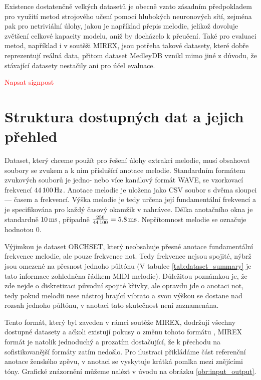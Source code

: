 Existence dostatenčně velkých datasetů je obecně vzato zásadním předpokladem pro využití metod strojového učení pomocí hlubokých neuronových sítí, zejména pak pro netriviální úlohy, jakou je například přepis melodie, jelikož dovoluje zvětšení celkové kapacity modelu, aniž by docházelo k přeučení. Také pro evaluaci metod, například i v soutěži MIREX, jsou potřeba takové datasety, které dobře reprezentují reálná data, přitom dataset MedleyDB vznikl mimo jiné z důvodu, že stávající datasety nestačily ani pro účel evaluace. 

\textcolor{red}{Napsat signpost}




\section{Struktura dostupných dat a jejich přehled}

Dataset, který chceme použít pro řešení úlohy extrakci melodie, musí obsahovat soubory se zvukem a k nim příslušící anotace melodie. Standardním formátem zvukových souborů je jedno- nebo více kanálový formát WAVE, se vzorkovací frekvencí $44\,100\,\rm Hz$. Anotace melodie je uložena jako CSV soubor s dvěma sloupci --- časem a frekvencí. Výška melodie je tedy určena její fundamentální frekvencí a je specifikována pro každý časový okamžik v nahrávce. Délka anotačního okna je standardně $10\,\rm ms$, případně $\frac{256}{44\,100} = 5.8 \,\rm ms$. Nepřítomnost melodie se označuje hodnotou 0.

Výjimkou je dataset ORCHSET, který neobsahuje přesné anotace fundamentální frekvence melodie, ale pouze frekvence not. Tedy frekvence nejsou spojité, nýbrž jsou omezené na přesnost jednoho půltónu (V tabulce \ref{tab:dataset_summary} je tato informace zohledněna řádkem MIDI melodie). Důležitou poznámkou je, že zde nejde o diskretizaci původní spojité křivky, ale opravdu jde o anotaci not, tedy pokud melodii nese nástroj hrající vibrato a svou výškou se dostane nad rozsah jednoho půltónu, v anotaci tato skutečnost není zaznamenána. 

Tento formát, který byl zaveden v rámci soutěže MIREX, dodržují všechny dostupné datasety a ačkoli existují pokusy o změnu tohoto formátu \citep{Humphrey2014a}, MIREX formát je natolik jednoduchý a prozatím dostačující, že k přechodu na sofistikovanější formáty zatím nedošlo. Pro ilustraci přikládáme část referenční anotace ženského zpěvu, v anotaci se vyskytuje krátká pomlka mezi znějícími tóny. Grafické znázornění můžeme nalézt v úvodu na obrázku \ref{obr:input_output}.

